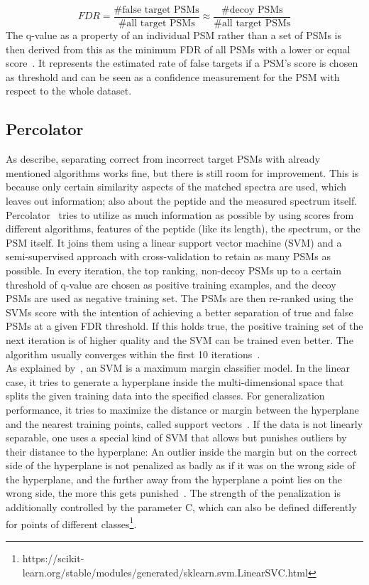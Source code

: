 	\begin{equation}
	FDR = \frac{\text{\# false target PSMs}}{\text{\# all target PSMs}} \approx  \frac{\text{\# decoy PSMs}}{\text{\# all target PSMs}}
	\end{equation}
	The q-value as a property of an individual PSM rather than a set of PSMs is then derived from this as the minimum FDR of all PSMs with a lower or equal score~\cite{Granholm2012, Aggarwal2016}. It represents the estimated rate of false targets if a PSM's score is chosen as threshold and can be seen as a confidence measurement for the PSM with respect to the whole dataset.
	\subsection{Percolator}
	\label{lab:background:percolator} As \citet{Kll2007} describe, separating correct from incorrect target PSMs with already mentioned algorithms works fine, but there is still room for improvement. This is because only certain similarity aspects of the matched spectra are used, which leaves out information; also about the peptide and the measured spectrum itself. Percolator~\cite{Kll2007, Granholm2012} tries to utilize as much information as possible by using scores from different algorithms, features of the peptide (like its length), the spectrum, or the PSM itself. It joins them using a linear support vector machine (SVM) and a semi-supervised approach with cross-validation to retain as many PSMs as possible. In every iteration, the top ranking, non-decoy PSMs up to a certain threshold of q-value are chosen as positive training examples, and the decoy PSMs are used as negative training set. The PSMs are then re-ranked using the SVMs score with the intention of achieving a better separation of true and false PSMs at a given FDR threshold. If this holds true, the positive training set of the next iteration is of higher quality and the SVM can be trained even better. The algorithm usually converges within the first 10 iterations~\cite{Kll2007}.\\
	As explained by~\citet{Bishop2006}, an SVM is a maximum margin classifier model. In the linear case, it tries to generate a hyperplane inside the multi-dimensional space that splits the given training data into the specified classes. For generalization performance, it tries to maximize the distance or margin between the hyperplane and the nearest training points, called support vectors~\cite{Bishop2006}. If the data is not linearly separable, one uses a special kind of SVM that allows but punishes outliers by their distance to the hyperplane: An outlier inside the margin but on the correct side of the hyperplane is not penalized as badly as if it was on the wrong side of the hyperplane, and the further away from the hyperplane a point lies on the wrong side, the more this gets punished~\cite{Bishop2006}. The strength of the penalization is additionally controlled by the parameter C, which can also be defined differently for points of different classes\footnote{https://scikit-learn.org/stable/modules/generated/sklearn.svm.LinearSVC.html}.\\
